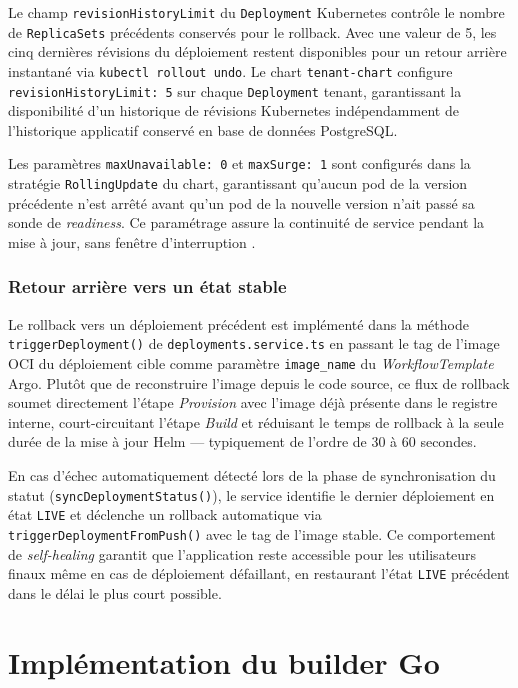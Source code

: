 Le champ \texttt{revisionHistoryLimit} du \texttt{Deployment} Kubernetes contrôle le nombre de \texttt{ReplicaSets} précédents conservés pour le rollback. Avec une valeur de 5, les cinq dernières révisions du déploiement restent disponibles pour un retour arrière instantané via \texttt{kubectl rollout undo}.  Le chart \texttt{tenant-chart} configure \texttt{revisionHistoryLimit: 5} sur chaque \texttt{Deployment} tenant, garantissant la disponibilité d'un historique de révisions Kubernetes indépendamment de l'historique applicatif conservé en base de données PostgreSQL.

Les paramètres \texttt{maxUnavailable: 0} et \texttt{maxSurge: 1} sont configurés dans la stratégie \texttt{RollingUpdate} du chart, garantissant qu'aucun pod de la version précédente n'est arrêté avant qu'un pod de la nouvelle version n'ait passé sa sonde de \textit{readiness}. Ce paramétrage assure la continuité de service pendant la mise à jour, sans fenêtre d'interruption \cite{k8s-rollback}.

\subsubsection*{Retour arrière vers un état stable}

Le rollback vers un déploiement précédent est implémenté dans la méthode \texttt{triggerDeployment()} de \texttt{deployments.service.ts} en passant le tag de l'image OCI du déploiement cible comme paramètre \texttt{image\_name} du \textit{WorkflowTemplate} Argo. Plutôt que de reconstruire l'image depuis le code source, ce flux de rollback soumet directement l'étape \textit{Provision} avec l'image déjà présente dans le registre interne, court-circuitant l'étape \textit{Build} et réduisant le temps de rollback à la seule durée de la mise à jour Helm — typiquement de l'ordre de 30 à 60 secondes.

En cas d'échec automatiquement détecté lors de la phase de synchronisation du statut (\texttt{syncDeploymentStatus()}), le service identifie le dernier déploiement en état \texttt{LIVE} et déclenche un rollback automatique via \texttt{triggerDeploymentFromPush()} avec le tag de l'image stable. Ce comportement de \textit{self-healing} garantit que l'application reste accessible pour les utilisateurs finaux même en cas de déploiement défaillant, en restaurant l'état \texttt{LIVE} précédent dans le délai le plus court possible.

\section{Implémentation du builder Go}

